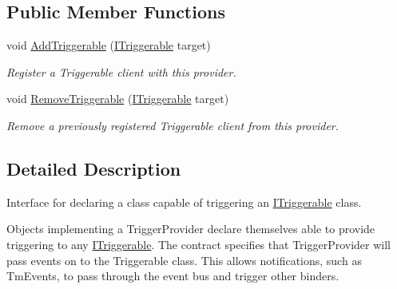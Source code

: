 \subsection*{Public Member Functions}
\begin{DoxyCompactItemize}
\item 
\hypertarget{interfacestrange_1_1extensions_1_1dispatcher_1_1api_1_1_i_trigger_provider_aaf6162c2f0f00d6b42076f7b2397828a}{void \hyperlink{interfacestrange_1_1extensions_1_1dispatcher_1_1api_1_1_i_trigger_provider_aaf6162c2f0f00d6b42076f7b2397828a}{Add\-Triggerable} (\hyperlink{interfacestrange_1_1extensions_1_1dispatcher_1_1api_1_1_i_triggerable}{I\-Triggerable} target)}\label{interfacestrange_1_1extensions_1_1dispatcher_1_1api_1_1_i_trigger_provider_aaf6162c2f0f00d6b42076f7b2397828a}

\begin{DoxyCompactList}\small\item\em Register a Triggerable client with this provider. \end{DoxyCompactList}\item 
\hypertarget{interfacestrange_1_1extensions_1_1dispatcher_1_1api_1_1_i_trigger_provider_ad582237786b479b01b15b42e4751a0de}{void \hyperlink{interfacestrange_1_1extensions_1_1dispatcher_1_1api_1_1_i_trigger_provider_ad582237786b479b01b15b42e4751a0de}{Remove\-Triggerable} (\hyperlink{interfacestrange_1_1extensions_1_1dispatcher_1_1api_1_1_i_triggerable}{I\-Triggerable} target)}\label{interfacestrange_1_1extensions_1_1dispatcher_1_1api_1_1_i_trigger_provider_ad582237786b479b01b15b42e4751a0de}

\begin{DoxyCompactList}\small\item\em Remove a previously registered Triggerable client from this provider. \end{DoxyCompactList}\end{DoxyCompactItemize}


\subsection{Detailed Description}
Interface for declaring a class capable of triggering an \hyperlink{interfacestrange_1_1extensions_1_1dispatcher_1_1api_1_1_i_triggerable}{I\-Triggerable} class. 

Objects implementing a Trigger\-Provider declare themselves able to provide triggering to any \hyperlink{interfacestrange_1_1extensions_1_1dispatcher_1_1api_1_1_i_triggerable}{I\-Triggerable}. The contract specifies that Trigger\-Provider will pass events on to the Triggerable class. This allows notifications, such as Tm\-Events, to pass through the event bus and trigger other binders.


